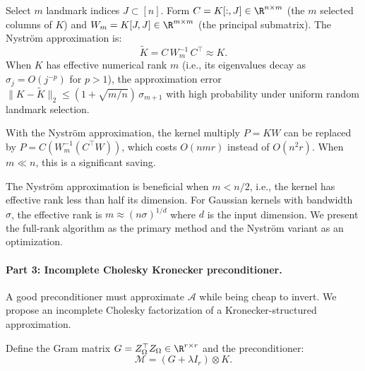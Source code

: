 \begin{definition}\label{def:p10-nystrom}
Select $m$ landmark indices $J \subset [n]$. Form $C = K[:,J] \in \R^{n \times m}$
(the $m$ selected columns of $K$) and $W_m = K[J,J] \in \R^{m \times m}$
(the principal submatrix). The Nystr\"om approximation is:
\begin{equation}\label{eq:p10-nystrom}
  \widetilde{K} = C\,W_m^{-1}\,C^\top \approx K.
\end{equation}
When $K$ has effective numerical rank $m$ (i.e., its eigenvalues decay as
$\sigma_j = O(j^{-p})$ for $p > 1$), the approximation error
$\|K - \widetilde{K}\|_2 \leq (1 + \sqrt{m/n})\,\sigma_{m+1}$
with high probability under uniform random landmark selection.
\end{definition}

With the Nystr\"om approximation, the kernel multiply $P = KW$ can be
replaced by $P = C(W_m^{-1}(C^\top W))$, which costs $O(nmr)$ instead
of $O(n^2 r)$. When $m \ll n$, this is a significant saving.

\begin{remark}\label{rem:p10-nystrom-when}
The Nystr\"om approximation is beneficial when $m < n/2$, i.e., the kernel
has effective rank less than half its dimension. For Gaussian kernels with
bandwidth $\sigma$, the effective rank is $m \approx (n\sigma)^{1/d}$ where
$d$ is the input dimension. We present the full-rank algorithm as the primary
method and the Nystr\"om variant as an optimization.
\end{remark}

\paragraph{Part 3: Incomplete Cholesky Kronecker preconditioner.}

A good preconditioner must approximate $\mathcal{A}$ while being cheap to
invert. We propose an incomplete Cholesky factorization of a Kronecker-structured
approximation.

\begin{definition}\label{def:p10-precond}
Define the Gram matrix $G = Z_\Omega^\top Z_\Omega \in \R^{r \times r}$ and the
preconditioner:
\begin{equation}\label{eq:p10-precond}
  \mathcal{M} = (G + \lambda I_r) \otimes K.
\end{equation}
\end{definition}

